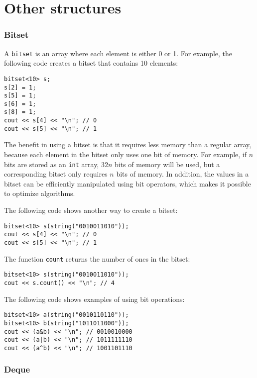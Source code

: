 \section{Other structures}

\subsubsection{Bitset}


A \texttt{bitset} is an array
where each element is either 0 or 1.
For example, the following code creates
a bitset that contains 10 elements:
\begin{lstlisting}
bitset<10> s;
s[2] = 1;
s[5] = 1;
s[6] = 1;
s[8] = 1;
cout << s[4] << "\n"; // 0
cout << s[5] << "\n"; // 1
\end{lstlisting}

The benefit in using a bitset is that
it requires less memory than a regular array,
because each element in the bitset only
uses one bit of memory.
For example, 
if $n$ bits are stored as an \texttt{int} array,
$32n$ bits of memory will be used,
but a corresponding bitset only requires $n$ bits of memory.
In addition, the values in a bitset
can be efficiently manipulated using
bit operators, which makes it possible to
optimize algorithms.

The following code shows another way to create a bitset:
\begin{lstlisting}
bitset<10> s(string("0010011010"));
cout << s[4] << "\n"; // 0
cout << s[5] << "\n"; // 1
\end{lstlisting}

The function \texttt{count} returns the number
of ones in the bitset:

\begin{lstlisting}
bitset<10> s(string("0010011010"));
cout << s.count() << "\n"; // 4
\end{lstlisting}

The following code shows examples of using bit operations:
\begin{lstlisting}
bitset<10> a(string("0010110110"));
bitset<10> b(string("1011011000"));
cout << (a&b) << "\n"; // 0010010000
cout << (a|b) << "\n"; // 1011111110
cout << (a^b) << "\n"; // 1001101110
\end{lstlisting}

\subsubsection{Deque}

